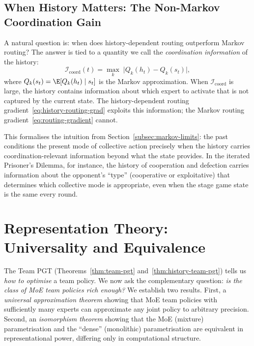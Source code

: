 \subsection{When History Matters: The Non-Markov Coordination Gain}
\label{subsec:non-markov-gain}

A natural question is: when does history-dependent routing outperform Markov routing? The answer is tied to a quantity we call the \emph{coordination information} of the history:
\begin{equation}\label{eq:coord-info}
  \mathcal{I}_{\mathrm{coord}}(t) = \max_k\;\bigl|Q_k(h_t) - Q_k(s_t)\bigr|,
\end{equation}
where $Q_k(s_t)=\E[Q_k(h_t)\mid s_t]$ is the Markov approximation. When $\mathcal{I}_{\mathrm{coord}}$ is large, the history contains information about which expert to activate that is not captured by the current state. The history-dependent routing gradient~\eqref{eq:history-routing-grad} exploits this information; the Markov routing gradient~\eqref{eq:routing-gradient} cannot.

This formalises the intuition from Section~\ref{subsec:markov-limits}: the past conditions the present mode of collective action precisely when the history carries coordination-relevant information beyond what the state provides. In the iterated Prisoner's Dilemma, for instance, the history of cooperation and defection carries information about the opponent's ``type'' (cooperative or exploitative) that determines which collective mode is appropriate, even when the stage game state is the same every round.

\section{Representation Theory: Universality and Equivalence}
\label{sec:representation}

The Team PGT (Theorems~\ref{thm:team-pgt} and~\ref{thm:history-team-pgt}) tells us \emph{how to optimise} a team policy. We now ask the complementary question: \emph{is the class of MoE team policies rich enough?} We establish two results. First, a \emph{universal approximation theorem} showing that MoE team policies with sufficiently many experts can approximate any joint policy to arbitrary precision. Second, an \emph{isomorphism theorem} showing that the MoE (mixture) parametrisation and the ``dense'' (monolithic) parametrisation are equivalent in representational power, differing only in computational structure.

